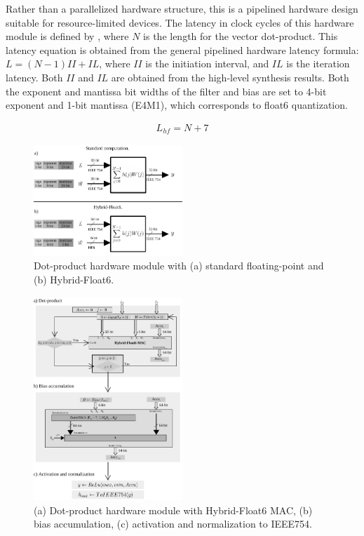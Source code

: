 Rather than a parallelized hardware structure, this is a pipelined hardware design suitable for resource-limited devices. The latency in clock cycles of this hardware module is defined by , where $N$ is the length for the vector dot-product. This latency equation is obtained from the general pipelined hardware latency formula: $L=\left(N-1\right)II+IL$, where $II$ is the initiation interval, and $IL$ is the iteration latency. Both $II$ and $IL$ are obtained from the high-level synthesis results. Both the exponent and mantissa bit widths of the filter and bias are set to 4-bit exponent and 1-bit mantissa (E4M1), which corresponds to float6 quantization.

\begin{eqnarray} \label{eq:dot_custom_float_latency}
L_{hf}=N+7
\end{eqnarray}

\begin{figure}[t!]
	\centering
	\includegraphics[width=0.5\textwidth]{./chapters/cnn_accelerator/figures/dot-product_unit.pdf}
	\caption{Dot-product hardware module with (a) standard floating-point and (b) Hybrid-Float6.}
	\label{fig:dot_product}
\end{figure}

\begin{figure}[t!]
	\centering
	\includegraphics[width=0.5\textwidth]{./chapters/cnn_accelerator/figures/dot_product_hybrid.pdf}
	\caption{(a) Dot-product hardware module with Hybrid-Float6 MAC, (b) bias accumulation, (c) activation and normalization to IEEE754.}
	\label{fig:dot_product_loop}
\end{figure}

